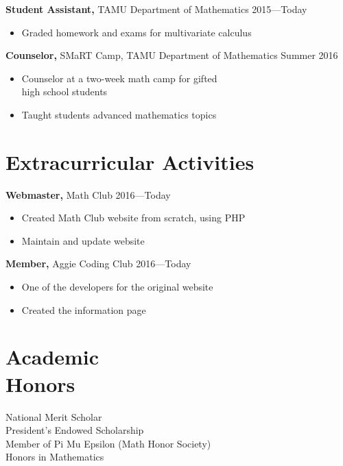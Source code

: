 \documentclass[margin]{res}
\begin{document}
\begin{resume}
{\bf Student Assistant,} TAMU Department of Mathematics \hfill  2015---Today
\begin{itemize} \itemsep -2pt %
    \item Graded homework and exams for multivariate calculus
\end{itemize}

{\bf Counselor,} SMaRT Camp, TAMU Department of Mathematics \hfill Summer 2016
\begin{itemize} \itemsep -2pt
    \item  Counselor at a two-week math camp for gifted \\ high school students
    \item Taught students advanced mathematics topics
\end{itemize}


\section{Extracurricular Activities} 
{\bf Webmaster,} Math Club \hfill 2016---Today
\begin{itemize} \itemsep -2pt
    \item Created Math Club website from scratch, using PHP
    \item Maintain and update website
\end{itemize}

{\bf Member,} Aggie Coding Club \hfill 2016---Today
\begin{itemize} \itemsep -2pt
    \item One of the developers for the original website 
    \item Created the information page
\end{itemize}


\section{Academic \\ Honors} 
National Merit Scholar \\
President's Endowed Scholarship \\
Member of Pi Mu Epsilon (Math Honor Society) \\
Honors in Mathematics



\end{resume}
\end{document}
